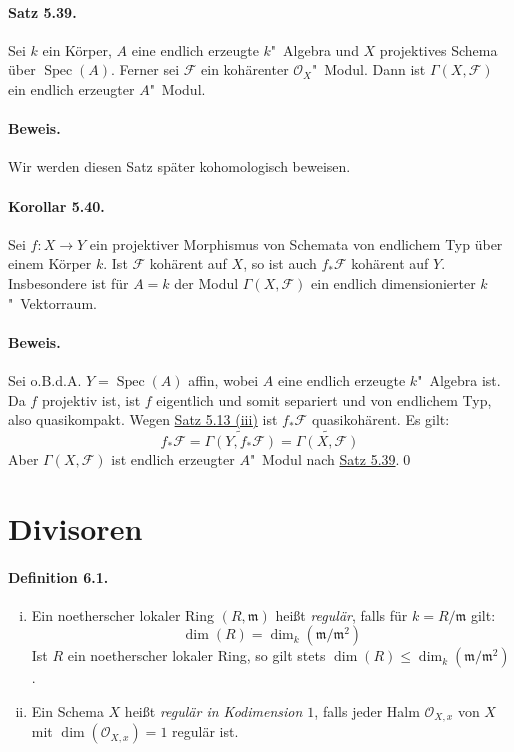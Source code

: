 \paragraph{Satz 5.39.}\label{5.39} Sei $k$ ein Körper, $A$ eine endlich erzeugte $k$"~Algebra und $X$ projektives Schema über $\operatorname{Spec}(A)$. Ferner sei $\mathcal{F}$ ein kohärenter $\mathcal{O}_X$"~Modul. Dann ist $\Gamma(X,\mathcal{F})$ ein endlich erzeugter $A$"~Modul.

\paragraph{Beweis.} Wir werden diesen Satz später kohomologisch beweisen.

\paragraph{Korollar 5.40.}\label{5.40} Sei $f:X\to Y$ ein projektiver Morphismus von Schemata von endlichem Typ über einem Körper $k$. Ist $\mathcal{F}$ kohärent auf $X$, so ist auch $f_\ast\mathcal{F}$ kohärent auf $Y$. Insbesondere ist für $A=k$ der Modul $\Gamma(X,\mathcal{F})$ ein endlich dimensionierter $k$"~Vektorraum.

\paragraph{Beweis.} Sei o.B.d.A. $Y=\operatorname{Spec}(A)$ affin, wobei $A$ eine endlich erzeugte $k$"~Algebra ist. Da $f$ projektiv ist, ist $f$ eigentlich und somit separiert und von endlichem Typ, also quasikompakt. Wegen \hyperref[5.13]{Satz 5.13 (iii)} ist $f_\ast\mathcal{F}$ quasikohärent. Es gilt:
\[f_\ast\mathcal{F} = \widetilde{\Gamma(Y,f_\ast\mathcal{F})}=\widetilde{\Gamma(X,\mathcal{F})} \]
Aber $\Gamma(X,\mathcal{F})$ ist endlich erzeugter $A$"~Modul nach \hyperref[5.39]{Satz 5.39}.\qed

\section{Divisoren}

\paragraph{Definition 6.1.}\label{6.1} \begin{enumerate}[(i)]
\item Ein noetherscher lokaler Ring $(R,\mathfrak{m})$ heißt \textit{regulär}, falls für $k=R/\mathfrak{m}$ gilt:
\[\dim(R)=\dim_k (\mathfrak{m}/\mathfrak{m}^2)\]
Ist $R$ ein noetherscher lokaler Ring, so gilt stets $\dim(R)\leq\dim_k(\mathfrak{m}/\mathfrak{m}^2)$.
\item Ein Schema $X$ heißt \textit{regulär in Kodimension $1$}, falls jeder Halm $\mathcal{O}_{X,x}$ von $X$ mit $\dim(\mathcal{O}_{X,x})=1$ regulär ist.
\end{enumerate}

